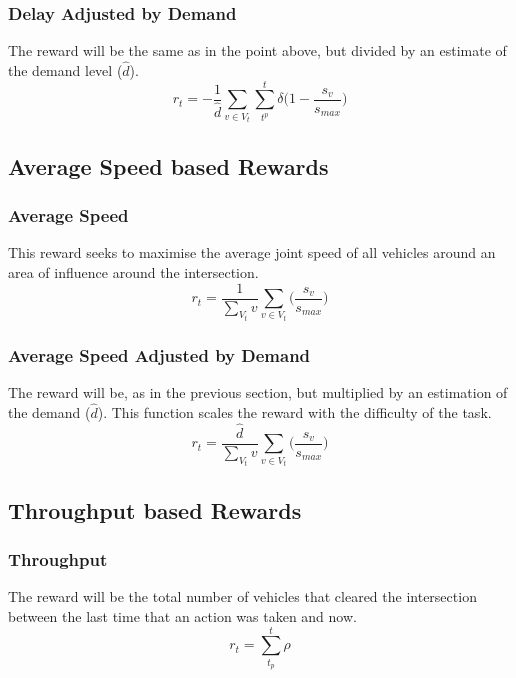\documentclass{article}
\begin{document}
\subsubsection{Delay Adjusted by Demand}
The reward will be the same as in the point above, but divided by an estimate of the demand level ($\hat{d}$).
\begin{equation}
    r_t = -\frac{1}{\hat{d}} \sum_{v\in V_t}  \sum_{t^p}^t \delta  \big( 1-\frac{s_v}{s_{max}} \big)
\label{eq:delay_dn}
\end{equation}

\subsection{Average Speed based Rewards}
\subsubsection{Average Speed}
This reward seeks to maximise the average joint speed of all vehicles around an area of influence around the intersection.
\begin{equation}
    r_t = \frac{1}{\sum_{V_t} v} \sum_{v \in V_t} \big( \frac{s_v}{s_{max}} \big)
\label{eq:avgspeed}
\end{equation}

\subsubsection{Average Speed Adjusted by Demand}
The reward will be, as in the previous section, but multiplied by an estimation of the demand ($\hat{d}$). This function scales the reward with the difficulty of the task.
\begin{equation}
    r_t = \frac{\hat{d}}{\sum_{V_t} v} \sum_{v \in V_t} \big( \frac{s_v}{s_{max}} \big)
\label{eq:avgspeed_dn}
\end{equation}

\subsection{Throughput based Rewards}
\subsubsection{Throughput}
The reward will be the total number of vehicles that cleared the intersection between the last time that an action was taken and now.
\begin{equation}
    r_t = \sum_{t_p}^t \rho
\label{eq:throughput}
\end{equation}
\end{document}
